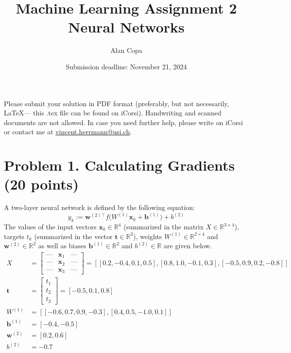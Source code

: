 \documentclass[a4paper,12pt]{article}
\title{Machine Learning Assignment 2\\
Neural Networks}
\date{Submission deadline: November 21, 2024}
\author{Alan Copa}
\begin{document}
\maketitle

\noindent Please submit your solution in PDF format (preferably, but not necessarily, \LaTeX --- this .tex file can be found on iCorsi). Handwriting and scanned documents are not allowed. 
In case you need further help, please write on iCorsi or contact me at \href{mailto:vincent.herrmann@idsia.ch}{vincent.herrmann@usi.ch}.

\section{Problem 1. Calculating Gradients (20 points)}
A two-layer neural network is defined by the following equation: 
$$
y_k := \mathbf{w}^{(2) \top} f\big( W^{(1)} \mathbf{x}_k + \mathbf{b}^{(1)}\big) + b^{(2)}
$$
The values of the input vectors $\mathbf{x}_k \in \mathbb{R}^4$ (summarized in the matrix $X \in \mathbb{R}^{3 \times 4}$), targets $t_k$ (summarized in the vector $\mathbf{t} \in \mathbb{R}^3$), weights $W^{(1)} \in \mathbb{R}^{2 \times 4}$ and $\mathbf{w}^{(2)} \in \mathbb{R}^2$ as well as biases $\mathbf{b}^{(1)} \in \mathbb{R}^2$ and $b^{(2)} \in \mathbb{R}$ are given below. 
\begin{align*}
    X &=
    \begin{bmatrix}
        \text{---} & \mathbf{x}_1 & \text{---} \\
        \text{---} & \mathbf{x}_2 & \text{---} \\
        \text{---} & \mathbf{x}_3 & \text{---}
    \end{bmatrix}
    = [[ 0.2, -0.4, 0.1, 0.5], [ 0.8, 1.0, -0.1, 0.3], [-0.5,  0.9, 0.2, -0.8]] \\
    \mathbf{t} &= 
    \begin{bmatrix}
        t_1 \\
        t_2 \\
        t_3 
    \end{bmatrix}
    = [-0.5, 0.1, 0.8] \\
    W^{(1)} &= [[-0.6, 0.7,  0.9, -0.3], [0.4,  0.5, -1.0, 0.1]] \\
    \mathbf{b}^{(1)} &= [-0.4, -0.5] \\
    \mathbf{w}^{(2)} &= [ 0.2, 0.6] \\
    b^{(2)} &= -0.7 \\
\end{align*}
\end{document}
